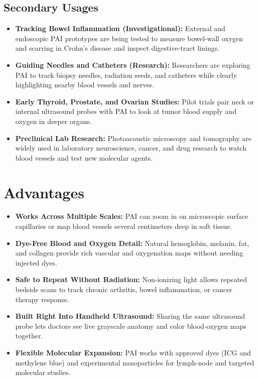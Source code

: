 \subsection{Secondary Usages}
\begin{itemize}
  \item \textbf{Tracking Bowel Inflammation (Investigational):} External and endoscopic PAI prototypes are being tested to measure bowel-wall oxygen and scarring in Crohn's disease and inspect digestive-tract linings.
  \item \textbf{Guiding Needles and Catheters (Research):} Researchers are exploring PAI to track biopsy needles, radiation seeds, and catheters while clearly highlighting nearby blood vessels and nerves.
  \item \textbf{Early Thyroid, Prostate, and Ovarian Studies:} Pilot trials pair neck or internal ultrasound probes with PAI to look at tumor blood supply and oxygen in deeper organs.
  \item \textbf{Preclinical Lab Research:} Photoacoustic microscopy and tomography are widely used in laboratory neuroscience, cancer, and drug research to watch blood vessels and test new molecular agents.
\end{itemize}

\section{Advantages}
\begin{itemize}
  \item \textbf{Works Across Multiple Scales:} PAI can zoom in on microscopic surface capillaries or map blood vessels several centimeters deep in soft tissue.
  \item \textbf{Dye-Free Blood and Oxygen Detail:} Natural hemoglobin, melanin, fat, and collagen provide rich vascular and oxygenation maps without needing injected dyes.
  \item \textbf{Safe to Repeat Without Radiation:} Non-ionizing light allows repeated bedside scans to track chronic arthritis, bowel inflammation, or cancer therapy response.
  \item \textbf{Built Right Into Handheld Ultrasound:} Sharing the same ultrasound probe lets doctors see live grayscale anatomy and color blood-oxygen maps together.
  \item \textbf{Flexible Molecular Expansion:} PAI works with approved dyes (ICG and methylene blue) and experimental nanoparticles for lymph-node and targeted molecular studies.
\end{itemize}

